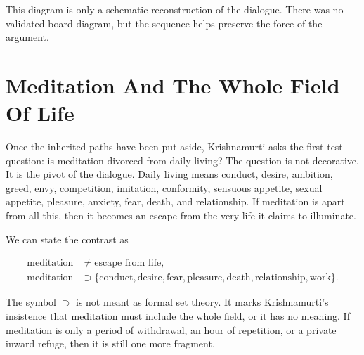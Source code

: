 \begin{figure}
\centering
{}
\end{figure}

This diagram is only a schematic reconstruction of the dialogue. There was no validated board diagram, but the sequence helps preserve the force of the argument.

\section{Meditation And The Whole Field Of Life}

Once the inherited paths have been put aside, Krishnamurti asks the first test question: is meditation divorced from daily living? The question is not decorative. It is the pivot of the dialogue. Daily living means conduct, desire, ambition, greed, envy, competition, imitation, conformity, sensuous appetite, sexual appetite, pleasure, anxiety, fear, death, and relationship. If meditation is apart from all this, then it becomes an escape from the very life it claims to illuminate.

We can state the contrast as

\begin{align}
\text{meditation} &\neq \text{escape from life},\\
\text{meditation} &\supset
\{\text{conduct}, \text{desire}, \text{fear}, \text{pleasure},
\text{death}, \text{relationship}, \text{work}\}.
\end{align}

The symbol \(\supset\) is not meant as formal set theory. It marks Krishnamurti's insistence that meditation must include the whole field, or it has no meaning. If meditation is only a period of withdrawal, an hour of repetition, or a private inward refuge, then it is still one more fragment.


